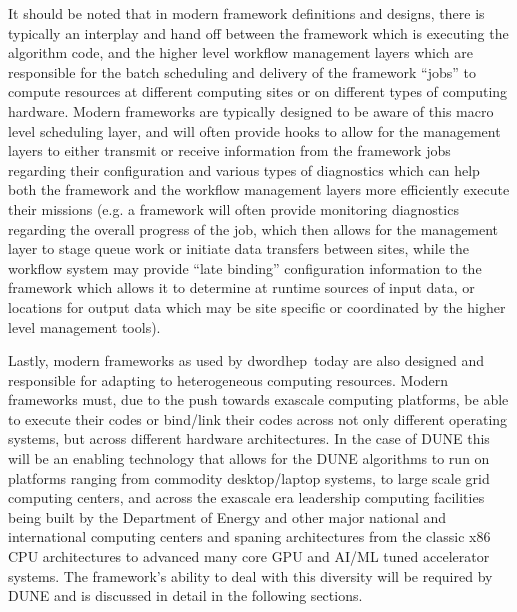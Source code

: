 \documentclass[../main-v1.tex]{subfiles}
\begin{document}

It should be noted that in modern framework definitions and designs, there is typically an interplay and hand off between the framework which is executing the algorithm code, and the higher level workflow management layers which are responsible for the batch scheduling and delivery of the framework ``jobs'' to compute resources at different computing sites or on different types of computing hardware.  Modern frameworks are typically designed to be aware of this macro level scheduling layer, and will often provide hooks to allow for the management layers to either transmit or receive information from the framework jobs regarding their configuration and various types of diagnostics which can help both the framework and the workflow management layers more efficiently execute their missions (e.g. a framework will often provide monitoring diagnostics regarding the overall progress of the job, which then allows for the management layer to stage queue work or initiate data transfers between sites,  while the workflow system may provide ``late binding'' configuration information to the framework which allows it to determine at runtime sources of input data, or locations for output data which may be site specific or coordinated by the higher level management tools).

Lastly, modern frameworks as used by dword{hep}\ today are also designed and responsible for adapting to  heterogeneous computing resources.  Modern frameworks must, due to the push towards exascale computing platforms, be able to execute their codes or bind/link their codes across not only different operating systems, but across different hardware architectures.   In the case of DUNE this will be an enabling technology that allows for the DUNE algorithms to run on platforms ranging from commodity desktop/laptop systems, to large scale grid computing centers, and across the exascale era leadership computing facilities being built by the Department of Energy and other major national and international computing centers and spaning architectures from the classic x86 CPU architectures to advanced many core GPU and AI/ML tuned accelerator systems.  The framework's ability to deal with this diversity will be required by DUNE and is discussed in detail in the following sections.
\end{document}
